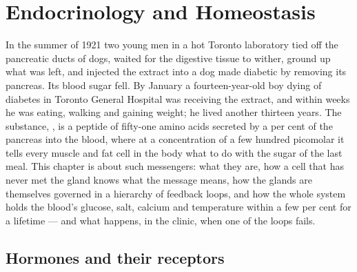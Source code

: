 \chapter{Endocrinology and Homeostasis}\label{ch:b3:endocrinology}

In the summer of 1921 two young men in a hot Toronto laboratory tied
off the pancreatic ducts of dogs, waited for the digestive tissue to
wither, ground up what was left, and injected the extract into a dog
made diabetic by removing its pancreas. Its blood sugar fell. By
January a fourteen-year-old boy dying of diabetes in Toronto General
Hospital was receiving the extract, and within weeks he was eating,
walking and gaining weight; he lived another thirteen years. The
substance, , is a peptide of fifty-one amino acids secreted by
a per cent of the pancreas into the blood, where at a concentration of
a few hundred picomolar it tells every muscle and fat cell in the body
what to do with the sugar of the last meal. This chapter is about such
messengers: what they are, how a cell that has never met the gland
knows what the message means, how the glands are themselves governed
in a hierarchy of feedback loops, and how the whole system holds the
blood's glucose, salt, calcium and temperature within a few per cent
for a lifetime --- and what happens, in the clinic, when one of the
loops fails.

\section{Hormones and their receptors}

